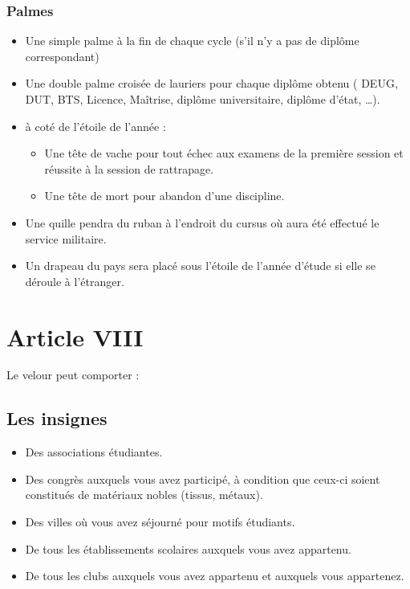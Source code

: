 \subsubsection*{Palmes}
\begin{itemize}
\item Une simple palme à la fin de chaque cycle (s'il n'y a pas de diplôme correspondant)
\item Une double palme croisée de lauriers pour chaque diplôme obtenu ( DEUG, DUT,
BTS, Licence, Maîtrise, diplôme universitaire, diplôme d'état, \ldots).
\item à coté de l'étoile de l'année :
	\begin{itemize}
	\item  Une tête de vache pour tout échec aux examens de la première session et
	réussite à la session de rattrapage.
	\item Une tête de mort pour abandon d'une discipline.
	\end{itemize}

\item Une quille pendra du ruban à l'endroit du cursus où aura été effectué le service
militaire.

\item Un drapeau du pays sera placé sous l'étoile de l'année d'étude si elle se déroule à
l'étranger.

\end{itemize}

\section{Article VIII}
\label{Article VIII}
Le velour peut comporter :
\subsection{Les insignes}
\begin{itemize}
\item Des associations étudiantes.
\item Des congrès auxquels vous avez participé, à condition que ceux-ci soient constitués
de matériaux nobles (tissus, métaux).
\item Des villes où vous avez séjourné pour motifs étudiants.
\item De tous les établissements scolaires auxquels vous avez appartenu.
\item De tous les clubs auxquels vous avez appartenu et auxquels vous appartenez.
\end{itemize}


